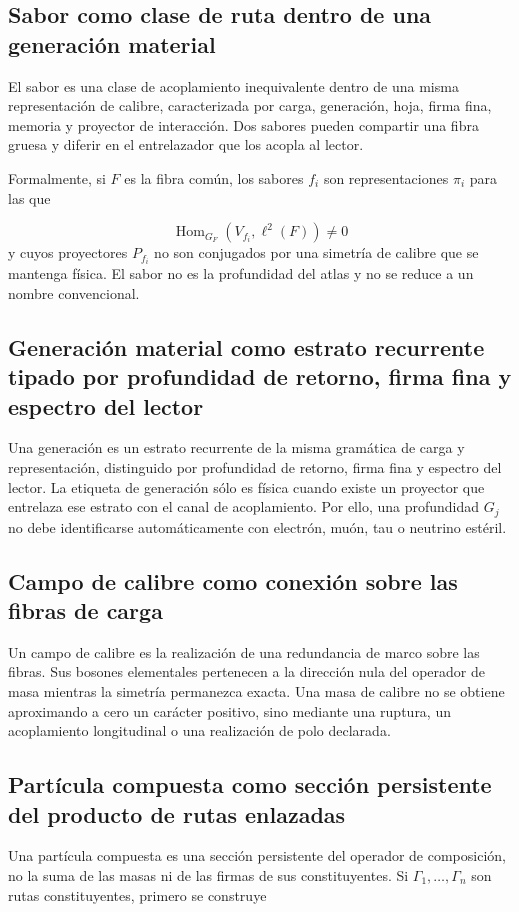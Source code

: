 \subsection{Sabor como clase de ruta dentro de una generación material}
El sabor es una clase de acoplamiento inequivalente dentro de una misma representación de calibre, caracterizada por carga, generación, hoja, firma fina, memoria y proyector de interacción. Dos sabores pueden compartir una fibra gruesa y diferir en el entrelazador que los acopla al lector.

Formalmente, si \(F\) es la fibra común, los sabores \(f_i\) son representaciones \(\pi_i\) para las que

\[
 \operatorname{Hom}_{G_F}(V_{f_i},\ell^2(F))\ne0
\]
y cuyos proyectores \(P_{f_i}\) no son conjugados por una simetría de calibre que se mantenga física. El sabor no es la profundidad del atlas y no se reduce a un nombre convencional.

\subsection{Generación material como estrato recurrente tipado por profundidad de retorno, firma fina y espectro del lector}
Una generación es un estrato recurrente de la misma gramática de carga y representación, distinguido por profundidad de retorno, firma fina y espectro del lector. La etiqueta de generación sólo es física cuando existe un proyector que entrelaza ese estrato con el canal de acoplamiento. Por ello, una profundidad \(G_j\) no debe identificarse automáticamente con electrón, muón, tau o neutrino estéril.

\subsection{Campo de calibre como conexión sobre las fibras de carga}
Un campo de calibre es la realización de una redundancia de marco sobre las fibras. Sus bosones elementales pertenecen a la dirección nula del operador de masa mientras la simetría permanezca exacta. Una masa de calibre no se obtiene aproximando a cero un carácter positivo, sino mediante una ruptura, un acoplamiento longitudinal o una realización de polo declarada.

\subsection{Partícula compuesta como sección persistente del producto de rutas enlazadas}
Una partícula compuesta es una sección persistente del operador de composición, no la suma de las masas ni de las firmas de sus constituyentes. Si \(\Gamma_1,\ldots,\Gamma_n\) son rutas constituyentes, primero se construye

